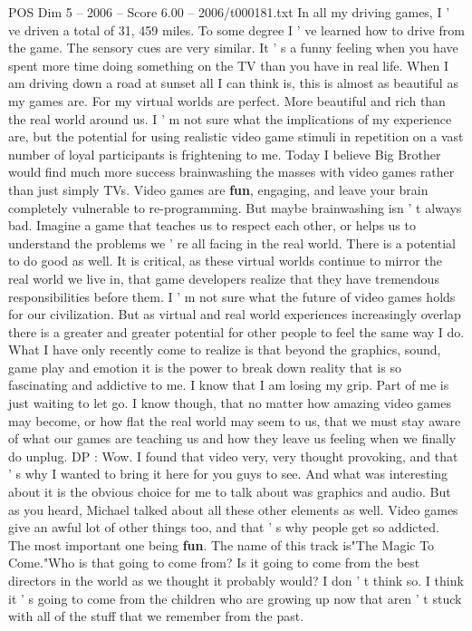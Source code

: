 \begin{textsample}{POS Dim 5 – 2006 – Score 6.00 – 2006/t000181.txt}
In all my driving games, I ' ve driven a total of 31, 459 miles.
To some degree I ' ve learned how to drive from the game.
The sensory cues are very similar.
It ' s a funny feeling when you have spent more time doing something on the TV than you have in real life.
When I am driving down a road at sunset all I can think is, this is almost as beautiful as my games are.
For my virtual worlds are perfect.
More beautiful and rich than the real world around us.
I ' m not sure what the implications of my experience are, but the potential for using realistic video game stimuli in repetition on a vast number of loyal participants is frightening to me.
Today I believe Big Brother would find much more success brainwashing the masses with video games rather than just simply TVs.
Video games are \textbf{fun}, engaging, and leave your brain completely vulnerable to re-programming.
But maybe brainwashing isn ' t always bad.
Imagine a game that teaches us to respect each other, or helps us to understand the problems we ' re all facing in the real world.
There is a potential to do good as well.
It is critical, as these virtual worlds continue to mirror the real world we live in, that game developers realize that they have tremendous responsibilities before them.
I ' m not sure what the future of video games holds for our civilization.
But as virtual and real world experiences increasingly overlap there is a greater and greater potential for other people to feel the same way I do.
What I have only recently come to realize is that beyond the graphics, sound, game play and emotion it is the power to break down reality that is so fascinating and addictive to me.
I know that I am losing my grip.
Part of me is just waiting to let go.
I know though, that no matter how amazing video games may become, or how flat the real world may seem to us, that we must stay aware of what our games are teaching us and how they leave us feeling when we finally do unplug.
DP : Wow.
I found that video very, very thought provoking, and that ' s why I wanted to bring it here for you guys to see.
And what was interesting about it is the obvious choice for me to talk about was graphics and audio.
But as you heard, Michael talked about all these other elements as well.
Video games give an awful lot of other things too, and that ' s why people get so addicted.
The most important one being \textbf{fun}.
The name of this track is"The Magic To Come."Who is that going to come from?
Is it going to come from the best directors in the world as we thought it probably would?
I don ' t think so.
I think it ' s going to come from the children who are growing up now that aren ' t stuck with all of the stuff that we remember from the past.

\end{textsample}
